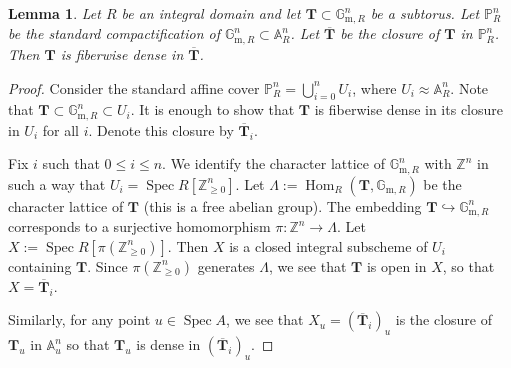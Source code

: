 \documentclass[11pt]{amsart}
\newcommand\A{\mathbb A}
\renewcommand\P{\mathbb P}
\newcommand\gm[1]{\mathbb{G}_{\mathrm{m},#1}}
\newcommand\gmR{\gm{R}}
\DeclareMathOperator\Spec{{Spec}}
\DeclareMathOperator{\Hom}{Hom}
\theoremstyle{plain}
\newtheorem{lemma}[proposition]{Lemma}
\theoremstyle{definition}
\theoremstyle{remark}
\newcommand\bT{{\mathbf T}}
\newcommand\Z{\mathbb Z}
\begin{document}
\begin{lemma}\label{lm:FibDense}
  Let $R$ be an integral domain and let $\bT\subset\gmR^n$ be a subtorus. Let $\P_R^n$ be the standard compactification of $\gmR^n\subset\A_R^n$. Let $\overline\bT$ be the closure of $\bT$ in $\P_R^n$. Then $\bT$ is fiberwise dense in $\overline\bT$.
\end{lemma}
\begin{proof}
Consider the standard affine cover $\P_R^n=\bigcup_{i=0}^n U_i$, where $U_i\approx\A_R^n$. Note that $\bT\subset\gmR^n\subset U_i$. It is enough to show that $\bT$ is fiberwise dense in its closure in $U_i$ for all $i$. Denote this closure by $\overline\bT_i$.

Fix $i$ such that $0\le i\le n$. We identify the character lattice of $\gmR^n$ with $\Z^n$ in such a way that $U_i=\Spec R[\Z_{\ge0}^n]$. Let $\Lambda:=\Hom_R(\bT,\gmR)$ be the character lattice of $\bT$ (this is a free abelian group). The embedding $\bT\hookrightarrow\gmR^n$ corresponds to a surjective homomorphism $\pi\colon\Z^n\to\Lambda$. Let $X:=\Spec R[\pi(\Z_{\ge0}^n)]$. Then $X$ is a closed integral subscheme of $U_i$ containing $\bT$. Since $\pi(\Z_{\ge0}^n)$ generates $\Lambda$, we see that $\bT$ is open in $X$, so that $X=\overline\bT_i$.

Similarly, for any point $u\in\Spec A$, we see that $X_u=(\overline\bT_i)_u$ is the closure of $\bT_u$ in $\A^n_u$ so that $\bT_u$ is dense in $(\overline\bT_i)_u$.
\end{proof}
\end{document}

